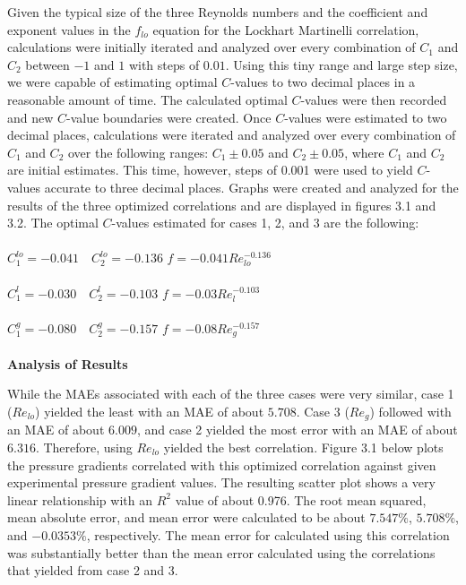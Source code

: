 Given the typical size of the three Reynolds numbers and the coefficient and exponent values in the \(f_{lo}\) equation for the Lockhart Martinelli correlation, calculations were initially iterated and analyzed over every combination of \(C_1\) and \(C_2\) between \(-1\) and \(1\) with steps of \(0.01\). Using this tiny range and large step size, we were capable of estimating optimal \(C\)-values to two decimal places in a reasonable amount of time. The calculated optimal \(C\)-values were then recorded and new \(C\)-value boundaries were created. Once \(C\)-values were estimated to two decimal places, calculations were iterated and analyzed over every combination of \(C_1\) and \(C_2\) over the following ranges: \(C_1\pm 0.05\) and \(C_2\pm 0.05\), where \(C_1\) and \(C_2\) are initial estimates. This time, however, steps of 0.001 were used to yield \(C\)-values accurate to three decimal places. Graphs were created and analyzed for the results of the three optimized correlations and are displayed in figures 3.1 and 3.2. The optimal \(C\)-values estimated for cases 1, 2, and 3 are the following:\\
\\
\(C_1^{lo}=-0.041\quad C_2^{lo}=-0.136\) \dotfill \(f=-0.041Re_{lo}^{-0.136}\)\\
\\
\(C_1^{l}=-0.030\quad C_2^{l}=-0.103\) \dotfill \(f=-0.03Re_{l}^{-0.103}\)\\
\\
\(C_1^{g}=-0.080\quad C_2^{g}=-0.157\) \dotfill \(f=-0.08Re_{g}^{-0.157}\)\\
\\
\textbf{Analysis of Results}

While the MAEs associated with each of the three cases were very similar, case 1 (\(Re_{lo}\)) yielded the least with an MAE of about \(5.708\). Case 3 (\(Re_g\)) followed with an MAE of about \(6.009\), and case 2 yielded the most error with an MAE of about \(6.316\). Therefore, using \(Re_{lo}\) yielded the best correlation. Figure 3.1 below plots the pressure gradients correlated with this optimized correlation against given experimental pressure gradient values. The resulting scatter plot shows a very linear relationship with an \(R^2\) value of about 0.976. The root mean squared, mean absolute error, and mean error were calculated to be about \(7.547\%\), \(5.708\%\), and \(-0.0353\%\), respectively. The mean error for calculated using this correlation was substantially better than the mean error calculated using the correlations that yielded from case 2 and 3.\\

